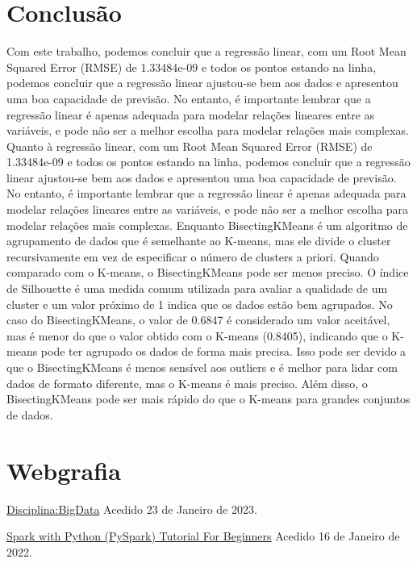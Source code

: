 \documentclass{article}
\begin{document}
\section{Conclusão}
Com este trabalho, podemos concluir que a  regressão linear, com um Root Mean Squared Error (RMSE) de 1.33484e-09 e todos os pontos estando na linha, podemos concluir que a regressão linear ajustou-se bem aos dados e apresentou uma boa capacidade de previsão. No entanto, é importante lembrar que a regressão linear é apenas adequada para modelar relações lineares entre as variáveis, e pode não ser a melhor escolha para modelar relações mais complexas. Quanto à regressão linear, com um Root Mean Squared Error (RMSE) de 1.33484e-09 e todos os pontos estando na linha, podemos concluir que a regressão linear ajustou-se bem aos dados e apresentou uma boa capacidade de previsão. No entanto, é importante lembrar que a regressão linear é apenas adequada para modelar relações lineares entre as variáveis, e pode não ser a melhor escolha para modelar relações mais complexas. Enquanto BisectingKMeans é um algoritmo de agrupamento de dados que é semelhante ao K-means, mas ele divide o cluster recursivamente em vez de especificar o número de clusters a priori. Quando comparado com o K-means, o BisectingKMeans pode ser menos preciso. O índice de Silhouette é uma medida comum utilizada para avaliar a qualidade de um cluster e um valor próximo de 1 indica que os dados estão bem agrupados. No caso do BisectingKMeans, o valor de 0.6847 é considerado um valor aceitável, mas é menor do que o valor obtido com o K-means (0.8405), indicando que o K-means pode ter agrupado os dados de forma mais precisa. Isso pode ser devido a que o BisectingKMeans é menos sensível aos outliers e é melhor para lidar com dados de formato diferente, mas o K-means é mais preciso. Além disso, o BisectingKMeans pode ser mais rápido do que o K-means para grandes conjuntos de dados.

\newpage
\section{Webgrafia}

\href{https://moodle.ips.pt/2223/pluginfile.php/143102/mod_resource/content/0/ML.pdf}{Disciplina:BigData}
\newline
Acedido 23 de Janeiro de 2023.
\medskip
\newline

\href{https://sparkbyexamples.com/pyspark-tutorial/l}{Spark with Python (PySpark) Tutorial For Beginners}
\newline
Acedido 16 de Janeiro de 2022.
\medskip
\end{document}
